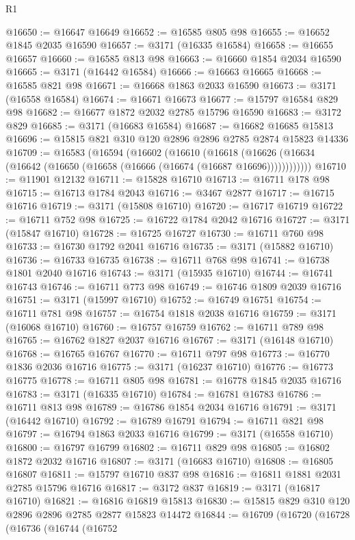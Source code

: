 \begin{lexlean}{R1}
\begin{coremodule}
@16650 := @16647 @16649
@16652 := @16585 @805 @98
@16655 := @16652 @1845 @2035 @16590
@16657 := @3171 (@16335 @16584)
@16658 := @16655 @16657
@16660 := @16585 @813 @98
@16663 := @16660 @1854 @2034 @16590
@16665 := @3171 (@16442 @16584)
@16666 := @16663 @16665
@16668 := @16585 @821 @98
@16671 := @16668 @1863 @2033 @16590
@16673 := @3171 (@16558 @16584)
@16674 := @16671 @16673
@16677 := @15797 @16584 @829 @98
@16682 := @16677 @1872 @2032 @2785 @15796 @16590
@16683 := @3172 @829
@16685 := @3171 (@16683 @16584)
@16687 := @16682 @16685 @15813
@16696 := @15815 @821 @310 @120 @2896 @2896 @2785 @2874 @15823 @14336
@16709 := @16583
    (@16594
      (@16602
        (@16610
          (@16618 (@16626 (@16634 (@16642 (@16650 (@16658 (@16666 (@16674 (@16687 @16696))))))))))))
@16710 := @11901 @12132
@16711 := @15828 @16710
@16713 := @16711 @178 @98
@16715 := @16713 @1784 @2043
@16716 := @3467 @2877
@16717 := @16715 @16716
@16719 := @3171 (@15808 @16710)
@16720 := @16717 @16719
@16722 := @16711 @752 @98
@16725 := @16722 @1784 @2042 @16716
@16727 := @3171 (@15847 @16710)
@16728 := @16725 @16727
@16730 := @16711 @760 @98
@16733 := @16730 @1792 @2041 @16716
@16735 := @3171 (@15882 @16710)
@16736 := @16733 @16735
@16738 := @16711 @768 @98
@16741 := @16738 @1801 @2040 @16716
@16743 := @3171 (@15935 @16710)
@16744 := @16741 @16743
@16746 := @16711 @773 @98
@16749 := @16746 @1809 @2039 @16716
@16751 := @3171 (@15997 @16710)
@16752 := @16749 @16751
@16754 := @16711 @781 @98
@16757 := @16754 @1818 @2038 @16716
@16759 := @3171 (@16068 @16710)
@16760 := @16757 @16759
@16762 := @16711 @789 @98
@16765 := @16762 @1827 @2037 @16716
@16767 := @3171 (@16148 @16710)
@16768 := @16765 @16767
@16770 := @16711 @797 @98
@16773 := @16770 @1836 @2036 @16716
@16775 := @3171 (@16237 @16710)
@16776 := @16773 @16775
@16778 := @16711 @805 @98
@16781 := @16778 @1845 @2035 @16716
@16783 := @3171 (@16335 @16710)
@16784 := @16781 @16783
@16786 := @16711 @813 @98
@16789 := @16786 @1854 @2034 @16716
@16791 := @3171 (@16442 @16710)
@16792 := @16789 @16791
@16794 := @16711 @821 @98
@16797 := @16794 @1863 @2033 @16716
@16799 := @3171 (@16558 @16710)
@16800 := @16797 @16799
@16802 := @16711 @829 @98
@16805 := @16802 @1872 @2032 @16716
@16807 := @3171 (@16683 @16710)
@16808 := @16805 @16807
@16811 := @15797 @16710 @837 @98
@16816 := @16811 @1881 @2031 @2785 @15796 @16716
@16817 := @3172 @837
@16819 := @3171 (@16817 @16710)
@16821 := @16816 @16819 @15813
@16830 := @15815 @829 @310 @120 @2896 @2896 @2785 @2877 @15823 @14472
@16844 := @16709
    (@16720
      (@16728
        (@16736
          (@16744
            (@16752

\end{coremodule}
\end{lexlean}
